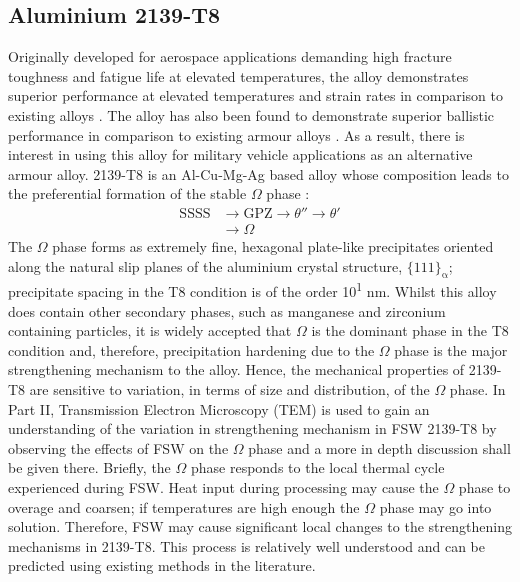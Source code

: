 \subsection{Aluminium 2139-T8}
\label{IntroAluminium2139t8}
Originally developed for aerospace applications demanding high fracture toughness and fatigue life at elevated temperatures, the alloy demonstrates superior performance at elevated temperatures and strain rates in comparison to existing alloys \cite{Cho2006,Vural2009}. The alloy has also been found to demonstrate superior ballistic performance in comparison to existing armour alloys \cite{Vural2009,Grujicic2010a}. As a result, there is interest in using this alloy for military vehicle applications as an alternative armour alloy. 2139-T8 is an Al-Cu-Mg-Ag based alloy whose composition leads to the preferential formation of the stable $\Omega$ phase \cite{Bakavos2008,Lee2010,Elkhodary2011b}:
\begin{equation*}
\begin{split}
\text{SSSS} & \rightarrow  \text{GPZ} \rightarrow \theta''\rightarrow \theta' \\
& \rightarrow \Omega
\end{split}
\end{equation*}
The $\Omega$ phase forms as extremely fine, hexagonal plate-like precipitates oriented along the natural slip planes of the aluminium crystal structure, $\text{\{111\}}_\mathrm{\alpha}$; precipitate spacing in the T8 condition is of the order 10\textsuperscript{1} nm. Whilst this alloy does contain other secondary phases, such as manganese and zirconium containing particles, it is widely accepted that $\Omega$ is the dominant phase in the T8 condition and, therefore, precipitation hardening due to the $\Omega$ phase is the major strengthening mechanism to the alloy. Hence, the mechanical properties of 2139-T8 are sensitive to variation, in terms of size and distribution, of the $\Omega$ phase. In Part II, Transmission Electron Microscopy (TEM) is used to gain an understanding of the variation in strengthening mechanism in FSW 2139-T8 by observing the effects of FSW on the $\Omega$ phase and a more in depth discussion shall be given there. Briefly, the $\Omega$ phase responds to the local thermal cycle experienced during FSW. Heat input during processing may cause the $\Omega$ phase to overage and coarsen; if temperatures are high enough the $\Omega$ phase may go into solution. Therefore, FSW may cause significant local changes to the strengthening mechanisms in 2139-T8. This process is relatively well understood and can be predicted using existing methods in the literature. 
